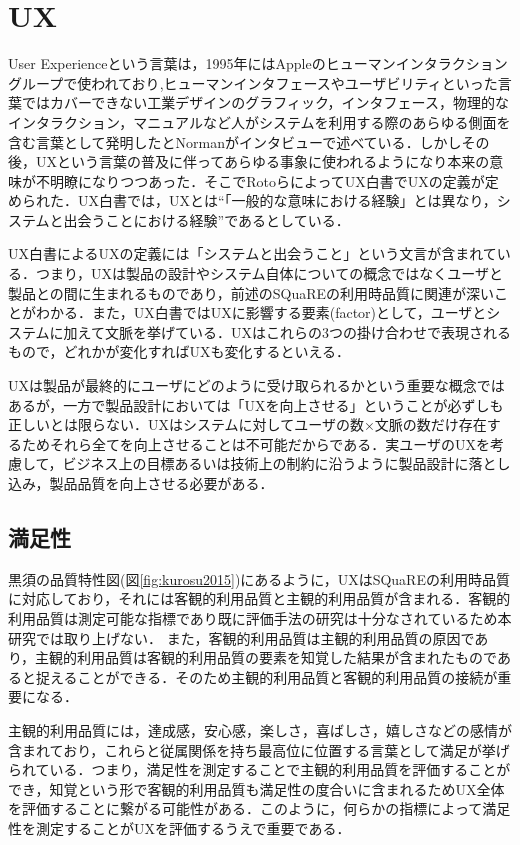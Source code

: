 \section{UX}

User Experienceという言葉は，1995年にはAppleのヒューマンインタラクショングループで使われており\cite{norman1995},ヒューマンインタフェースやユーザビリティといった言葉ではカバーできない工業デザインのグラフィック，インタフェース，物理的なインタラクション，マニュアルなど人がシステムを利用する際のあらゆる側面を含む言葉として発明したとNormanがインタビューで述べている\cite{normaninterview}．しかしその後，UXという言葉の普及に伴ってあらゆる事象に使われるようになり本来の意味が不明瞭になりつつあった．そこでRotoらによってUX白書でUXの定義が定められた．UX白書では，UXとは``「一般的な意味における経験」とは異なり，システムと出会うことにおける経験''であるとしている\cite{uxwhitepaper}．

UX白書によるUXの定義には「システムと出会うこと」という文言が含まれている．つまり，UXは製品の設計やシステム自体についての概念ではなくユーザと製品との間に生まれるものであり，前述のSQuaREの利用時品質に関連が深いことがわかる．また，UX白書ではUXに影響する要素(factor)として，ユーザとシステムに加えて文脈を挙げている\cite{uxwhitepaper}．UXはこれらの3つの掛け合わせで表現されるもので，どれかが変化すればUXも変化するといえる．

UXは製品が最終的にユーザにどのように受け取られるかという重要な概念ではあるが，一方で製品設計においては「UXを向上させる」ということが必ずしも正しいとは限らない．UXはシステムに対してユーザの数×文脈の数だけ存在するためそれら全てを向上させることは不可能だからである．実ユーザのUXを考慮して，ビジネス上の目標あるいは技術上の制約に沿うように製品設計に落とし込み，製品品質を向上させる必要がある．

\subsection{満足性}

黒須の品質特性図(図\ref{fig:kurosu2015})にあるように，UXはSQuaREの利用時品質に対応しており，それには客観的利用品質と主観的利用品質が含まれる．客観的利用品質は測定可能な指標であり既に評価手法の研究は十分なされているため本研究では取り上げない．
また，客観的利用品質は主観的利用品質の原因であり，主観的利用品質は客観的利用品質の要素を知覚した結果が含まれたものであると捉えることができる．そのため主観的利用品質と客観的利用品質の接続が重要になる．

主観的利用品質には，達成感，安心感，楽しさ，喜ばしさ，嬉しさなどの感情が含まれており，これらと従属関係を持ち最高位に位置する言葉として満足が挙げられている\cite{kurosu2011}．つまり，満足性を測定することで主観的利用品質を評価することができ，知覚という形で客観的利用品質も満足性の度合いに含まれるためUX全体を評価することに繋がる可能性がある．このように，何らかの指標によって満足性を測定することがUXを評価するうえで重要である．

